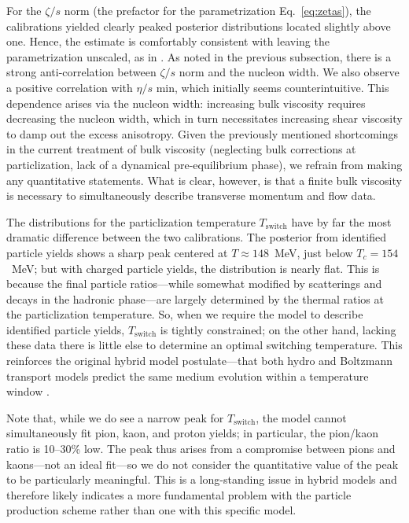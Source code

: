 \documentclass[aps,prc,reprint,amsmath,nofootinbib]{revtex4-1}
\begin{document}
For the $\zeta/s$ norm (the prefactor for the parametrization Eq.~\eqref{eq:zetas}), the calibrations yielded clearly peaked posterior distributions located slightly above one.
Hence, the estimate is comfortably consistent with leaving the parametrization unscaled, as in \cite{Ryu:2015vwa}.
As noted in the previous subsection, there is a strong anti-correlation between $\zeta/s$ norm and the nucleon width.
We also observe a positive correlation with $\eta/s$ min, which initially seems counterintuitive.
This dependence arises via the nucleon width:
increasing bulk viscosity requires decreasing the nucleon width, which in turn necessitates increasing shear viscosity to damp out the excess anisotropy.
Given the previously mentioned shortcomings in the current treatment of bulk viscosity (neglecting bulk corrections at particlization, lack of a dynamical pre-equilibrium phase), we refrain from making any quantitative statements.
What is clear, however, is that a finite bulk viscosity is necessary to simultaneously describe transverse momentum and flow data.

The distributions for the particlization temperature $T_\text{switch}$ have by far the most dramatic difference between the two calibrations.
The posterior from identified particle yields shows a sharp peak centered at $T \approx 148$~MeV, just below $T_c = 154$~MeV;
but with charged particle yields, the distribution is nearly flat.
This is because the final particle ratios---while somewhat modified by scatterings and decays in the hadronic phase---are largely determined by the thermal ratios at the particlization temperature.
So, when we require the model to describe identified particle yields, $T_\text{switch}$ is tightly constrained;
on the other hand, lacking these data there is little else to determine an optimal switching temperature.
This reinforces the original hybrid model postulate---that both hydro and Boltzmann transport models predict the same medium evolution within a temperature window \cite{Bass:2000ib,Nonaka:2006yn,Petersen:2008dd}.

Note that, while we do see a narrow peak for $T_\text{switch}$, the model cannot simultaneously fit pion, kaon, and proton yields;
in particular, the pion/kaon ratio is 10--30\% low.
The peak thus arises from a compromise between pions and kaons---not an ideal fit---so we do not consider the quantitative value of the peak to be particularly meaningful.
This is a long-standing issue in hybrid models \cite{Song:2013qma} and therefore likely indicates a more fundamental problem with the particle production scheme rather than one with this specific model.
\end{document}
